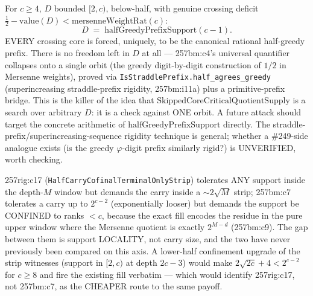 \begin{thm}
For $c\ge4$, $D$ bounded $[2,c)$, below-half, with genuine crossing deficit
$\tfrac12-\mathrm{value}(D) < \mathrm{mersenneWeightRat}(c)$:
\[
D \;=\; \mathrm{halfGreedyPrefixSupport}(c-1).
\]
EVERY crossing core is forced, uniquely, to be the canonical rational half-greedy prefix. There
is no freedom left in $D$ at all — 257bm:c4's universal quantifier collapses onto a single orbit
(the greedy digit-by-digit construction of $1/2$ in Mersenne weights), proved via
\texttt{IsStraddlePrefix.half\_agrees\_greedy} (superincreasing straddle-prefix rigidity, 257bm:i11a)
plus a primitive-prefix bridge. This is the killer of the idea that
$\mathrm{SkippedCoreCriticalQuotientSupply}$ is a search over arbitrary $D$: it is a check
against ONE orbit. A future attack should target the concrete arithmetic of
$\mathrm{halfGreedyPrefixSupport}$ directly. The straddle-prefix/superincreasing-sequence
rigidity technique is general; whether a \#249-side analogue exists (is the greedy $\varphi$-digit
prefix similarly rigid?) is UNVERIFIED, worth checking.
\par\noindent{}   
\end{thm}

\begin{obs}
257rig:c17 (\texttt{HalfCarryCofinalTerminalOnlyStrip}) tolerates ANY support inside the depth-$M$
window but demands the carry inside a $\sim2\sqrt M$ strip; 257bm:c7 tolerates a carry up to
$2^{c-2}$ (exponentially looser) but demands the support be CONFINED to ranks $<c$, because the
exact fill encodes the residue in the pure upper window where the Mersenne quotient is exactly
$2^{M-d}$ (257bm:c9). The gap between them is support LOCALITY, not carry size, and the two
have never previously been compared on this axis. A lower-half confinement upgrade of the strip
witnesses (support in $[2,c)$ at depth $2c-3$) would make $2\sqrt{2c}+4<2^{c-2}$ for $c\ge8$ and
fire the existing fill verbatim — which would identify 257rig:c17, not 257bm:c7, as the CHEAPER
route to the same payoff.
\par\noindent{}   
\end{obs}

